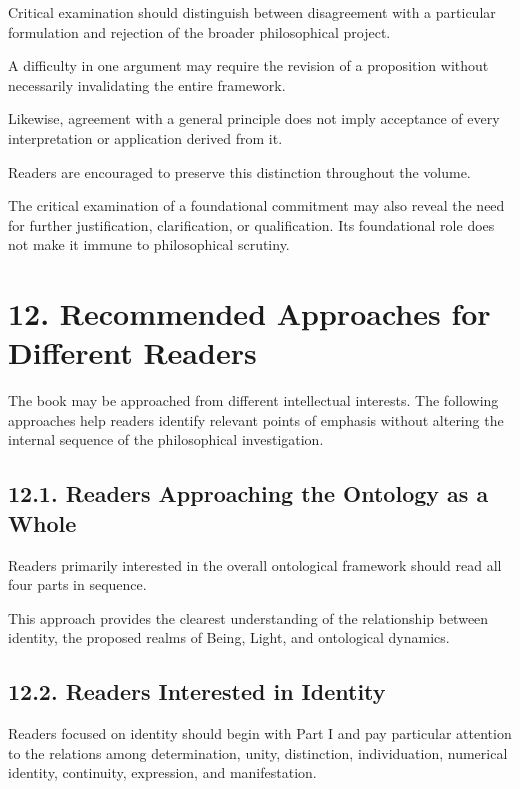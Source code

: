 Critical examination should distinguish
between disagreement with a particular
formulation and rejection of the broader
philosophical project.

A difficulty in one argument may require
the revision of a proposition without
necessarily invalidating the entire
framework.

Likewise, agreement with a general
principle does not imply acceptance
of every interpretation or application
derived from it.

Readers are encouraged to preserve
this distinction throughout the volume.

The critical examination of a foundational
commitment may also reveal the need
for further justification, clarification,
or qualification. Its foundational role
does not make it immune to philosophical
scrutiny.


\section*{12. Recommended Approaches for Different
Readers}

The book may be approached from different
intellectual interests. The following
approaches help readers identify relevant
points of emphasis without altering the
internal sequence of the philosophical
investigation.

\subsection*{12.1. Readers Approaching the Ontology
as a Whole}

Readers primarily interested in the
overall ontological framework should
read all four parts in sequence.

This approach provides the clearest
understanding of the relationship
between identity, the proposed realms
of Being, Light, and ontological dynamics.

\subsection*{12.2. Readers Interested in Identity}

Readers focused on identity should
begin with Part I and pay particular
attention to the relations among
determination, unity, distinction,
individuation, numerical identity,
continuity, expression, and manifestation.

